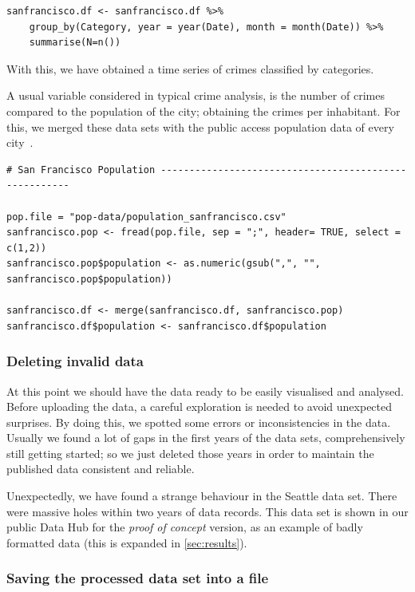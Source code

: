 \begin{lstlisting}
sanfrancisco.df <- sanfrancisco.df %>%
	group_by(Category, year = year(Date), month = month(Date)) %>%
	summarise(N=n())

\end{lstlisting}

With this, we have obtained a time series of crimes classified by categories.

A usual variable considered in typical crime analysis, is the number of crimes compared to the population of the city; obtaining the crimes per inhabitant. For this, we merged these data sets with the public access population data of every city~\cite{o:population}.

\begin{lstlisting}
# San Francisco Population ------------------------------------------------------

pop.file = "pop-data/population_sanfrancisco.csv"
sanfrancisco.pop <- fread(pop.file, sep = ";", header= TRUE, select = c(1,2))
sanfrancisco.pop$population <- as.numeric(gsub(",", "", sanfrancisco.pop$population))

sanfrancisco.df <- merge(sanfrancisco.df, sanfrancisco.pop)
sanfrancisco.df$population <- sanfrancisco.df$population
\end{lstlisting}

\subsubsection*{Deleting invalid data}

At this point we should have the data ready to be easily visualised and analysed. Before uploading the data, a careful exploration is needed to avoid unexpected surprises. By doing this, we spotted some errors or inconsistencies in the data. Usually we found a lot of gaps in the first years of the data sets, comprehensively still getting started; so we just deleted those years in order to maintain the published data consistent and reliable.

Unexpectedly, we have found a strange behaviour in the Seattle data set. There were massive holes within two years of data records. This data set is shown in our public Data Hub for the \emph{proof of concept} version, as an example of badly formatted data (this is expanded in \cref{sec:results}).

\subsubsection*{Saving the processed data set into a file}

